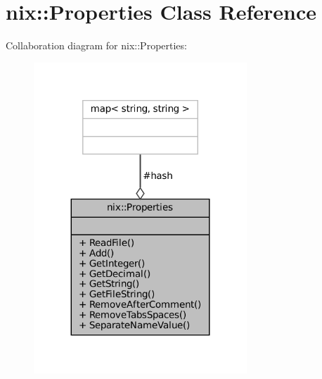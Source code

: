 \hypertarget{classnix_1_1Properties}{}\section{nix\+:\+:Properties Class Reference}
\label{classnix_1_1Properties}


Collaboration diagram for nix\+:\+:Properties\+:
\nopagebreak
\begin{figure}[H]
\begin{center}
\leavevmode
\includegraphics[width=227pt]{classnix_1_1Properties__coll__graph}
\end{center}
\end{figure}
